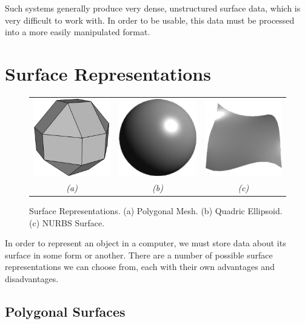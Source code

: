 Such systems generally produce very dense, unstructured surface data, which is very difficult to work with. In order to be usable, this data must be processed into a more easily manipulated format.

\section{\label{sec:litreview:surfaces}Surface Representations}
\begin{figure}
\begin{center}
\begin{tabular}{ccc}
\includegraphics[width=3.5cm]{../images/polymesh} &
\includegraphics[width=3.5cm]{../images/quadric} &
\includegraphics[width=3.5cm]{../images/nurbs} \\
{\it(a)} & {\it(b)} & {\it(c)}
\end{tabular}
\caption[Surface Representations]{\label{fig:surfaces} Surface Representations. (a) Polygonal Mesh. (b) Quadric Ellipsoid. (c) NURBS Surface.}
\end{center}
\end{figure}
In order to represent an object in a computer, we must store data about its surface in some form or another. There are a number of possible surface representations we can choose from, each with their own advantages and disadvantages.

\subsection{\label{sec:litreview:surfaces:polygon}Polygonal Surfaces}

